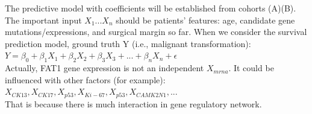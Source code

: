\documentclass[12pt, a4paper]{article}
\begin{document}
The predictive model with coefficients will be established from cohorts (A)(B). The important input $X_1...X_n$ should be patients' features: age, candidate gene mutations/expressions, and surgical margin so far.
When we consider the survival prediction model,
ground truth Y (i.e., malignant transformation):\\[0.5cm]
$Y = \beta_0 + \beta_1 X_1 + \beta_2 X_2 + \beta_3 X_3 + ... + \beta_n X_n + \epsilon$\\[0.3cm]
Actually, FAT1 gene expression is not an independent $X_{mrna}$. It could be influenced with other factors (for example):\\[0.3cm]
$X_{CK13}, X_{CK17}, X_{p53}, X_{Ki-67}, X_{p53}, X_{CAMK2N1}, ... $\\[0.3cm]
That is because there is much interaction in gene regulatory network. 
\end{document}
